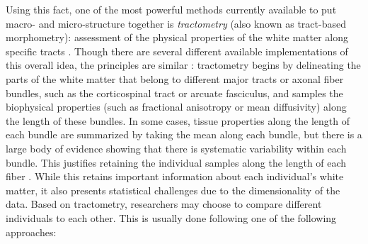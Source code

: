 Using this fact, one of the most powerful methods currently available to put
macro- and micro-structure together is \emph{tractometry} (also known as
tract-based morphometry): assessment of the physical properties of the white
matter along specific tracts \cite{Bells2011-cf}. Though there are several
different available implementations of this overall idea, the principles are
similar \cite{yeatman2012tract, Yendiki2011-ay, Wassermann2016-iv, ODonnell2009-uu}:
tractometry begins by delineating the parts of the white matter that belong to
different major tracts or axonal fiber bundles, such as the corticospinal tract
or arcuate fasciculus, and samples the biophysical properties (such as
fractional anisotropy or mean diffusivity) along the length of these bundles. In
some cases, tissue properties along the length of each bundle are summarized by
taking the mean along each bundle, but there is a large body of evidence showing
that there is systematic variability within each bundle. This justifies
retaining the individual samples along the length of each fiber
\cite{yeatman2012tract, colby2012, ODonnell2009-uu}. While this retains
important information about each individual's white matter, it also presents
statistical challenges due to the dimensionality of the data. Based on
tractometry, researchers may choose to compare different individuals to each
other. This is usually done following one of the following approaches:

